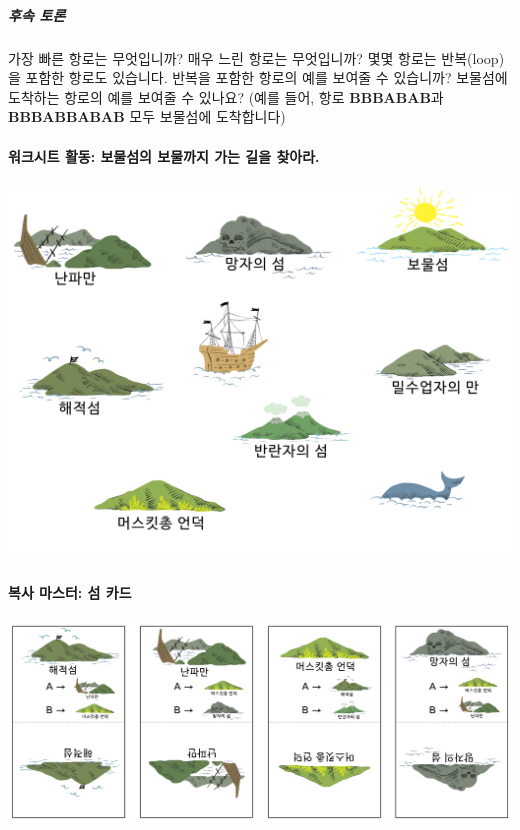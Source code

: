 \documentclass[]{article}
\begin{document}
\subparagraph{후속 토론}\label{section-164}

가장 빠른 항로는 무엇입니까? 매우 느린 항로는 무엇입니까? 몇몇 항로는
반복(loop)을 포함한 항로도 있습니다. 반복을 포함한 항로의 예를 보여줄 수
있습니까? 보물섬에 도착하는 항로의 예를 보여줄 수 있나요? (예를 들어,
항로 \textbf{BBBABAB}과 \textbf{BBBABBABAB} 모두 보물섬에 도착합니다)

\mbox{}\paragraph{워크시트 활동: 보물섬의 보물까지 가는 길을
찾아라.}\label{section-165}

\includegraphics{csunplugged/03-part/img/ch12-fsm/11-fsm-03-treasury-map-blank.png}

\mbox{}\paragraph{복사 마스터: 섬 카드}\label{section-166}

\includegraphics{csunplugged/03-part/img/ch12-fsm/11-fsm-04-treasury-map-card01.png}
\end{document}
